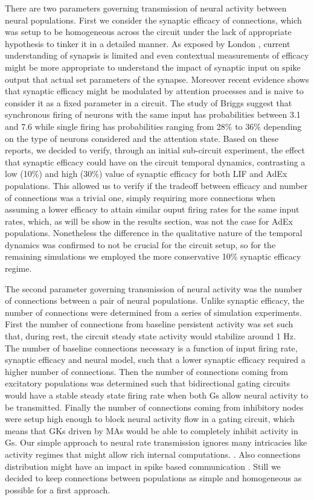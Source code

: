 \documentclass[10pt]{article}
\begin{document}
There are two parameters governing transmission of neural activity between neural populations.
First we consider the synaptic efficacy of connections, which was setup to be homogeneous across the circuit under the lack of appropriate hypothesis to tinker it in a detailed manner.
As exposed by London \cite{London_2002}, current understanding of synapsis is limited and even contextual measurements of efficacy might be more appropriate to understand the impact of synaptic input on spike output that actual set parameters of the synapse.
Moreover recent evidence \cite{Briggs_2013} shows that synaptic efficacy might be modulated by attention processes and is naive to consider it as a fixed parameter in a circuit.
The study of Briggs \cite{Briggs_2013} suggest that synchronous firing of neurons with the same input has probabilities between 3.1 and 7.6 while single firing has probabilities ranging from 28\% to 36\% depending on the type of neurons considered and the attention state.
Based on these reports, we decided to verify, through an initial sub-circuit experiment, the effect that synaptic efficacy could have on the circuit temporal dynamics, contrasting a low (10\%) and high (30\%) value of synaptic efficacy for both LIF and AdEx populations.
This allowed us to verify if the tradeoff between efficacy and number of connections was a trivial one, simply requiring more connections when assuming a lower efficacy to attain similar ouput firing rates for the same input rates, which, as will be show in the results section, was not the case for AdEx populations.
Nonetheless the difference in the qualitative nature of the temporal dynamics was confirmed to not be crucial for the circuit setup, so for the remaining simulations we employed the more conservative 10\% synaptic efficacy regime.

The second parameter governing transmission of neural activity was the number of connections between a pair of neural populations.
Unlike synaptic efficacy, the number of connections were determined from a series of simulation experiments.
First the number of connections from baseline persistent activity was set such that, during rest, the circuit steady state activity would stabilize around 1 Hz.
The number of baseline connections necessary is a function of input firing rate, synaptic efficacy and neural model, such that a lower synaptic efficacy required a higher number of connections.
Then the number of connections coming from excitatory populations was determined such that bidirectional gating circuits would have a stable steady state firing rate when both Gs allow neural activity to be transmitted.
Finally the number of connections coming from inhibitory nodes were setup high enough to block neural activity flow in a gating circuit, which means that GKs driven by MAs would be able to completely inhibit activity in Gs.
Our simple approach to neural rate transmission ignores many intricacies like activity regimes that might allow rich internal computations.
\cite{Ostojic_2014}.
Also connections distribution might have an impact in spike based communication \cite{Teramae_2012}.
Still we decided to keep connections between populations as simple and homogeneous as possible for a first approach.
\end{document}
